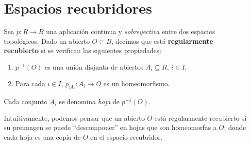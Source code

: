 \section{Espacios recubridores}

\begin{definicion}
    Sea $p:R\to B$ una aplicación continua y \emph{sobreyectiva} entre dos espacios topológicos. Dado un abierto $O\subset B$, decimos que está \textbf{regularmente recubierto} si se verifican las siguientes propiedades:
    \begin{enumerate}
        \item $p^{-1}(O)$ es una unión disjunta de abiertos $A_i\subseteq R$, $i\in I$.
        \item Para cada $i\in I$, $p_{|A_i}:A_i \to O$ es un homeomorfismo.
    \end{enumerate}

    Cada conjunto $A_i$ se denomina \emph{hoja} de $p^{-1}(O)$.
\end{definicion}

Intuitivamente, podemos pensar que un abierto $O$ está regularmente recubierto si su preimagen se puede ``descomponer'' en hojas que son homeomorfas a $O$; donde cada hoja es una copia de $O$ en el espacio recubridor. 

